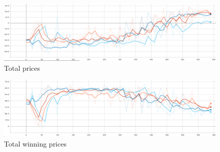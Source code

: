 \begin{figure}[H]
    \centering
    \includegraphics[width=\linewidth]{figures/4_test_eval_figs/net_arch_training_fig/total_prices.png}
    \caption{Total prices}
    \label{fig:net_arch_total_prices}
\end{figure}

\begin{figure}[H]
    \centering
    \includegraphics[width=\linewidth]{figures/4_test_eval_figs/net_arch_training_fig/total_winning_prices.png}
    \caption{Total winning prices}
    \label{fig:net_arch_total_winning_prices}
\end{figure}


